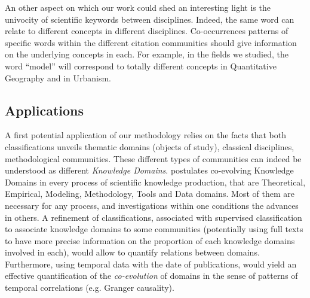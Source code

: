 An other aspect on which our work could shed an interesting light is the univocity of scientific keywords between disciplines. Indeed, the same word can relate to different concepts in different disciplines. Co-occurrences patterns of specific words within the different citation communities should give information on the underlying concepts in each. For example, in the fields we studied, the word ``model'' will correspond to totally different concepts in Quantitative Geography and in Urbanism.



\subsection*{Applications}


A first potential application of our methodology relies on the facts that both classifications unveils thematic domains (objects of study), classical disciplines, methodological communities. These different types of communities can indeed be understood as different \emph{Knowledge Domains}. \cite{raimbault2017applied} postulates co-evolving Knowledge Domains in every process of scientific knowledge production, that are Theoretical, Empirical, Modeling, Methodology, Tools and Data domains. Most of them are necessary for any process, and investigations within one conditions the advances in others. A refinement of classifications, associated with supervised classification to associate knowledge domains to some communities (potentially using full texts to have more precise information on the proportion of each knowledge domains involved in each), would allow to quantify relations between domains. Furthermore, using temporal data with the date of publications, would yield an effective quantification of the \emph{co-evolution} of domains in the sense of patterns of temporal correlations (e.g. Granger causality).



